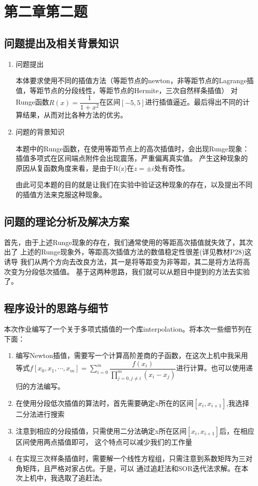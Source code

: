 \documentclass[10pt,a4paper]{ctexart}
\begin{document}
\section {第二章第二题}
\subsection{问题提出及相关背景知识}
\begin{enumerate}
\item 问题提出

本体要求使用不同的插值方法（等距节点的newton，非等距节点的Lagrange插值，等距节点的分段线性，等距节点的Hermite，三次自然样条插值）
对Runge函数$R(x)=\dfrac{1}{1+x^2}$在区间$[-5,5]$进行插值逼近。最后得出不同的计算结果，从而对比各种方法的优劣。
\item 问题的背景知识

本题中的Runge函数，在使用等距节点上的高次插值时，会出现Runge现象：插值多项式在区间端点附件会出现震荡，严重偏离真实值。
产生这种现象的原因从复函数角度来看，是由于R(z)在$z=\pm i$处有奇性。

由此可见本题的目的就是让我们在实验中验证这种现象的存在，以及提出不同的插值方法来克服这种现象。
\end{enumerate}
\subsection{问题的理论分析及解决方案}
首先，由于上述Runge现象的存在，我们通常使用的等距高次插值就失效了，其次出了
上述的Runge现象外，等距高次插值方法的数值稳定性很差(详见教材P28)这诱导
我们从两个方向去改良方法，其一是将等距变为非等距，其二是将方法将高次变为分段低次插值。
基于这两种思路，我们就可以从题目中提到的方法去实验了。
\subsection{程序设计的思路与细节}
本次作业编写了一个关于多项式插值的一个库interpolation。将本次一些细节列在下面：
\begin{enumerate}
\item 编写Newton插值，需要写一个计算高阶差商的子函数，在这次上机中我采用等式$f[x_0,x_1,\cdots,x_m]=\sum\limits_{i=0}^{m}\dfrac{f(x_i)}{
\prod\limits_{j=0,j\neq i}^{m}(x_i-x_j)}$进行计算。也可以使用递归的方法编写。
\item 
在使用分段低次插值的算法时，首先需要确定x所在的区间$[x_i,x_{i+1}]$,我选择二分法进行搜索

\item 
注意到相应的分段插值，只需使用二分法确定x所在区间$[x_i,x_{i+1}]$后，在相应区间使用两点插值即可，
这个特点可以减少我们的工作量

\item 
在实现三次样条插值时，需要解一个线性方程组，只需注意到系数矩阵为三对角矩阵，且严格对家占优。于是，可以
通过追赶法和SOR迭代法求解。在本次上机中，我选取了追赶法。


\end{enumerate}
\end{document}
